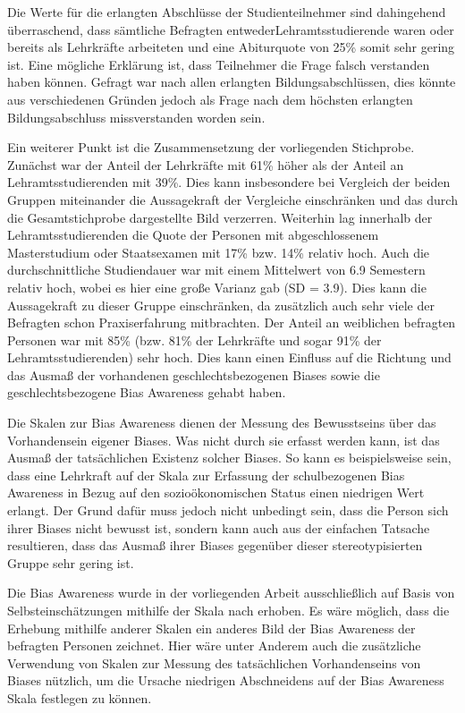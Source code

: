 Die Werte für die erlangten Abschlüsse der Studienteilnehmer sind dahingehend überraschend, dass sämtliche Befragten entweder\break Lehramtsstudierende waren oder bereits als Lehrkräfte arbeiteten und eine Abiturquote von 25\% somit sehr gering ist.
Eine mögliche Erklärung ist, dass Teilnehmer die Frage falsch verstanden haben können.
Gefragt war nach allen erlangten Bildungsabschlüssen, dies könnte aus verschiedenen Gründen jedoch als Frage nach dem höchsten erlangten Bildungsabschluss missverstanden worden sein.

Ein weiterer Punkt ist die Zusammensetzung der vorliegenden Stichprobe.
Zunächst war der Anteil der Lehrkräfte mit 61\% höher als der Anteil an Lehramtsstudierenden mit 39\%.
Dies kann insbesondere bei Vergleich der beiden Gruppen miteinander die Aussagekraft der Vergleiche einschränken und das durch die Gesamtstichprobe dargestellte Bild verzerren.
Weiterhin lag innerhalb der Lehramtsstudierenden die Quote der Personen mit abgeschlossenem Masterstudium oder Staatsexamen mit 17\% bzw. 14\% relativ hoch.
Auch die durchschnittliche Studiendauer war mit einem Mittelwert von 6.9 Semestern relativ hoch, wobei es hier eine große Varianz gab (SD = 3.9).
Dies kann die Aussagekraft zu dieser Gruppe einschränken, da zusätzlich auch sehr viele der Befragten schon Praxiserfahrung mitbrachten.
Der Anteil an weiblichen befragten Personen war mit 85\% (bzw. 81\% der Lehrkräfte und sogar 91\% der Lehramtsstudierenden) sehr hoch.
Dies kann einen Einfluss auf die Richtung und das Ausmaß der vorhandenen geschlechtsbezogenen Biases sowie die geschlechtsbezogene Bias Awareness gehabt haben.

Die Skalen zur Bias Awareness dienen der Messung des Bewusstseins über das Vorhandensein eigener Biases.
Was nicht durch sie erfasst werden kann, ist das Ausmaß der tatsächlichen Existenz solcher Biases.
So kann es beispielsweise sein, dass eine Lehrkraft auf der Skala zur Erfassung der schulbezogenen Bias Awareness in Bezug auf den sozioökonomischen Status einen niedrigen Wert erlangt.
Der Grund dafür muss jedoch nicht unbedingt sein, dass die Person sich ihrer Biases nicht bewusst ist, sondern kann auch aus der einfachen Tatsache resultieren, dass das Ausmaß ihrer Biases gegenüber dieser stereotypisierten Gruppe sehr gering ist.

Die Bias Awareness wurde in der vorliegenden Arbeit ausschließlich auf Basis von Selbsteinschätzungen mithilfe der Skala nach \citet{perry2015modern} erhoben.
Es wäre möglich, dass die Erhebung mithilfe anderer Skalen ein anderes Bild der Bias Awareness der befragten Personen zeichnet.
Hier wäre unter Anderem auch die zusätzliche Verwendung von Skalen zur Messung des tatsächlichen Vorhandenseins von Biases nützlich, um die Ursache niedrigen Abschneidens auf der Bias Awareness Skala festlegen zu können.

